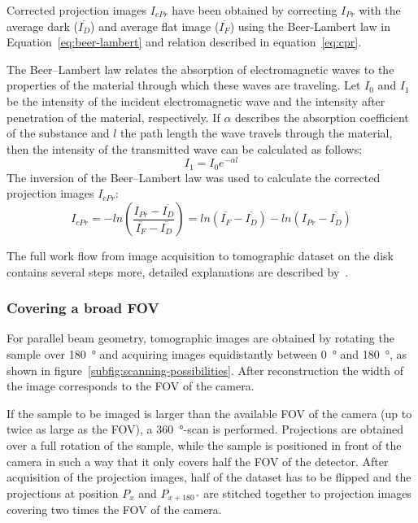 Corrected projection images $I_{cPr}$ have been obtained by correcting $I_{Pr}$ with the average dark ($\overline{I_{D}}$) and average flat image ($\overline{I_{F}}$) using the Beer-Lambert law in Equation~\ref{eq:beer-lambert} and relation described in equation~\ref{eq:cpr}.

The Beer--Lambert law relates the absorption of electromagnetic waves to the properties of the material through which these waves are traveling. Let $I_{0}$ and $I_{1}$ be the intensity of the incident electromagnetic wave and the intensity after penetration of the material, respectively. If $\alpha$ describes the absorption coefficient of the substance and $l$ the path length the wave travels through the material, then the intensity of the transmitted wave can be calculated as follows:
\begin{equation}
	I_{1}=I_{0}e^{-\alpha l}
\label{eq:beer-lambert}
\end{equation}
The inversion of the Beer--Lambert law was used to calculate the corrected projection images $I_{cPr}$:
\begin{equation}
	I_{cPr} = -ln\left(\frac{I_{Pr}-\overline{I_{D}}}{\overline{I_{F}}-\overline{I_{D}}}\right)
	= ln(\overline{I_{F}}-\overline{I_{D}})-ln(I_{Pr}-\overline{I_{D}})
	\label{eq:cpr}
\end{equation}
\cbend

The full work flow from image acquisition to tomographic dataset on the disk contains several steps more, detailed explanations are described by~\citet{Hintermueller2009}.

\subsubsection{Covering a broad FOV}
\label{subsec:covering a broad fov}

For parallel beam geometry, tomographic images are obtained by rotating the sample over \SI{180}{\degree} and acquiring images equidistantly between \SI{0}{\degree} and \SI{180}{\degree}, as shown in figure~\ref{subfig:scanning-possibilities}. After reconstruction the width of the image corresponds to the FOV of the camera.

If the sample to be imaged is larger than the available FOV of the camera (up to twice as large as the FOV), a \SI{360}{\degree}-scan is performed. Projections are obtained over a full rotation of the sample, while the sample is positioned in front of the camera in such a way that it only covers half the FOV of the detector. After acquisition of the projection images, half of the dataset has to be flipped and the projections at position $P_{x}$ and $P_{x+\SI{180}{\degree}}$ are stitched together to projection images covering two times the FOV of the camera.

